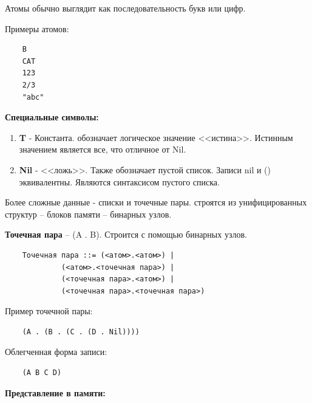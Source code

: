 Атомы обычно выглядит как последовательность букв или цифр.

Примеры атомов:
\begin{lstlisting}
	B
	CAT
	123
	2/3
	"abc"
\end{lstlisting}

\textbf{Специальные символы:}

\begin{enumerate}
	\item \textbf{T} - Константа. обозначает логическое значение <<истина>>. Истинным значением является все, что отличное от Nil.
	\item \textbf{Nil} - <<ложь>>. Также обозначает пустой список. Записи nil и () эквивалентны. Являются синтаксисом пустого списка.
\end{enumerate}

Более сложные данные - списки и точечные пары. строятся из унифицированных структур -- блоков памяти -- бинарных узлов.


\textbf{Точечная пара} -- (A . B). Строится с помощью бинарных узлов.   

\begin{lstlisting}
	Точечная пара ::= (<атом>.<атом>) |
		     (<атом>.<точечная пара>) |
	  		 (<точечная пара>.<атом>) |
	   		 (<точечная пара>.<точечная пара>)	
\end{lstlisting}

Пример точечной пары:
\begin{lstlisting}
	(A . (B . (C . (D . Nil))))
\end{lstlisting}
Облегченная форма записи:
\begin{lstlisting}
	(A B C D)
\end{lstlisting}

\begin{figure}[ht!]
\end{figure}

\textbf{Представление в памяти:}

